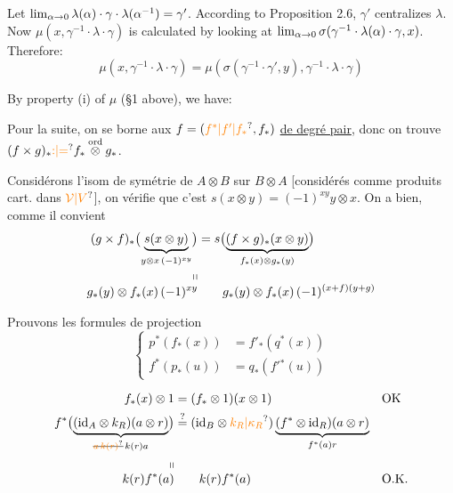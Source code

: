 Let $\lim_{\alpha\to 0}\lambda(\alpha)\cdot\gamma\cdot\lambda(\alpha^{-1})=\gamma'$. According to Proposition 2.6, $\gamma'$ centralizes $\lambda$. Now $\mu(x,\gamma^{-1}\cdot\lambda\cdot\gamma)$ is calculated by looking at $\lim_{\alpha\to 0}\sigma(\gamma^{-1}\cdot\lambda(\alpha)\cdot\gamma,x)$. Therefore:
\[
\mu(x,\gamma^{-1}\cdot\lambda\cdot\gamma)=\mu(\sigma(\gamma^{-1}\cdot\gamma',y),\gamma^{-1}\cdot\lambda\cdot\gamma)
\]

By property (i) of $\mu$ (\S1 above), we have:

Pour la suite, on se borne aux $f=(\unsure{f^*|f'|f_*},f_*)$ \uline{de degré pair}, donc on trouve $(f\times g)_*\unsure{{:}|{=}}f_*\overset{\mathrm{ord}}{\otimes}g_*$.

Considérons l'isom de symétrie de $A\otimes B$ sur $B\otimes A$ [considérés comme produits cart. dans $\unsure{\mathcal V|V}$], on vérifie que c'est $s(x\otimes y)=(-1)^{xy}y\otimes x$. On a bien, comme il convient
\[
\begin{aligned}
(g\times f)_*\bigl(\underbrace{s(x\otimes y)}_{y\otimes x\,(-1)^{xy}}\bigr)
 &=s\bigl(\underbrace{(f\times g)_*(x\otimes y)}_{f_*(x)\otimes g_*(y)}\bigr)\\[-2pt]
\shortparallel &\\[-4pt]
g_*(y)\otimes f_*(x)\,(-1)^{xy}
 &\qquad g_*(y)\otimes f_*(x)\,(-1)^{(x+f)(y+g)}
\end{aligned}
\]

Prouvons les formules de projection
\[
\left\{\begin{aligned}
p^*(f_*(x))&=f'_*(q^*(x))\\
f^*(p_*(u))&=q_*(f'{}^*(u))
\end{aligned}\right.
\]

\[
\begin{aligned}
 f_*(x)\otimes1&=(f_*\otimes1)(x\otimes1) &&\text{OK}\\
 f^*\bigl(\underbrace{(\mathrm{id}_A\otimes k_R)(a\otimes r)}_{\deleted{\unsure{a\,k(r)}}\,k(r)a}\bigr)
 &\overset{?}{=}(\mathrm{id}_B\otimes\unsure{k_R|\kappa_R})\underbrace{(f^*\otimes\mathrm{id}_R)(a\otimes r)}_{f^*(a)r}\\
 \shortparallel &\\[-3pt]
 k(r)f^*(a)&\qquad k(r)f^*(a)&&\text{O.K.}
\end{aligned}
\]

